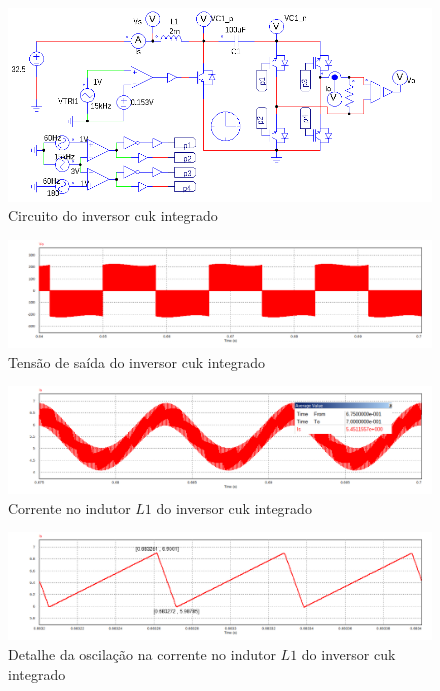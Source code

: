 \documentclass[
	12pt,				%
	openany,
	onseside,
	a4paper,			%
	english,			%
	french,				%
	spanish,			%
	brazil,				%
	]{abntex2}
\begin{document}
\begin{figure}[htbp]%
	\begin{center}%
		\includegraphics[width= \linewidth]{integ_cuk_circ_psim}
		\caption{Circuito do inversor cuk integrado}
		\label{fig:integ_cuk_met}
	\end{center}
\end{figure}

\begin{figure}[htb]%
	\centering
		\includegraphics[width= \linewidth]{cuk_integ_Vout}
		\caption{Tensão de saída do inversor cuk integrado}
		\label{fig:cuk_integ_ripp_V_out}
\end{figure}

\begin{figure}[htb]%
	\centering
		\includegraphics[width= \linewidth]{cuk_integ_IL1}
		\caption{Corrente no indutor $L1$ do inversor cuk integrado}
		\label{fig:cuk_integ_I_L1}
\end{figure}

\begin{figure}[htb]%
	\centering
		\includegraphics[width= \linewidth]{cuk_integ_ripp_IL1}
		\caption{Detalhe da oscilação na corrente no indutor $L1$ do inversor cuk integrado}
		\label{fig:cuk_integ_ripp_I_L1}
\end{figure}
\end{document}
